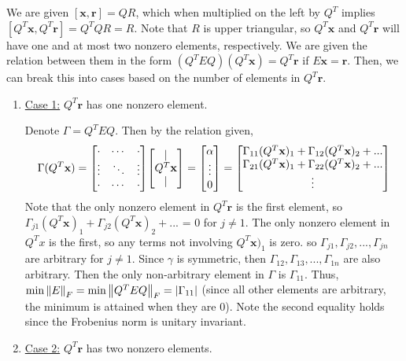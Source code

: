 \begin{solution}

    We are given $[\textbf{x}, \textbf{r}] = QR$, which when multiplied on the left by $Q^T$ implies $[Q^T\textbf{x}, Q^T\textbf{r}] = Q^TQR = R$. Note that $R$ is upper triangular, so $Q^T\textbf{x}$ and $ Q^T\textbf{r}$ will have one and at most two nonzero elements, respectively. We are given the relation between them in the form $ (Q^TEQ)(Q^T\textbf{x}) = Q^T\textbf{r}$ if $E\textbf{x} = \textbf{r}$. Then, we can break this into cases based on the number of elements in $Q^T\textbf{r}$.

    \begin{enumerate}
        \item \underline{Case 1:} $Q^T\textbf{r}$ has one nonzero element. 

        Denote $\Gamma = Q^TEQ$. Then by the relation given, 
        \[
        \Gamma (Q^T\textbf{x}) = \mqty[\cdot &\cdots &\cdot\\ \vdots &\ddots &\vdots\\ \cdot &\cdots &\cdot]\mqty[\vert \\ Q^T\textbf{x} \\ \vert] = \mqty[\alpha \\ \vdots\\0] = \mqty [\Gamma_{11}(Q^T\textbf{x})_1 + \Gamma_{12}(Q^T\textbf{x})_2 + ...\\ \Gamma_{21}(Q^T\textbf{x})_1 + \Gamma_{22}(Q^T\textbf{x})_2 + ...\\ \vdots]
        \]
        Note that the only nonzero element in $Q^T\textbf{r}$ is the first element, so $\Gamma_{j1}(Q^T\textbf{x})_1 + \Gamma_{j2}(Q^T\textbf{x})_2 + ...$ = 0 for $j \neq 1$. The only nonzero element in  $Q^Tx$ is the first, so any terms not involving $Q^T\textbf{x})_1$ is zero. so $\Gamma_{j1}, \Gamma_{j2}, ..., \Gamma_{jn}$ are arbitrary for $j\neq 1$. Since $\gamma$ is symmetric, then $\Gamma_{12}, \Gamma_{13},  ...,\Gamma_{1n}$ are also arbitrary. Then the only non-arbitrary element in $\Gamma$ is $\Gamma_{11}$. Thus, $\min \norm{E}_F = \min \norm{Q^TEQ}_F = \abs{\Gamma_{11}}$ (since all other elements are arbitrary, the minimum is attained when they are 0). Note the second equality holds since the Frobenius norm is unitary invariant. 

\newpage
        \item \underline{Case 2:} $Q^T\textbf{r}$ has two nonzero elements.


\end{enumerate}
\end{solution}
